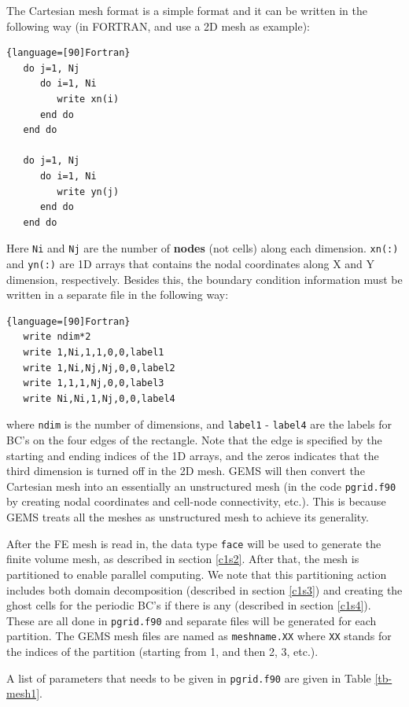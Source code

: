 \documentclass[11pt, letterpaper]{report}
\begin{document}
The Cartesian mesh format is a simple format and it can be written in the following way (in
FORTRAN, and use a 2D mesh as example):

\begin{lstlisting}{language=[90]Fortran}
   do j=1, Nj
      do i=1, Ni
         write xn(i)
      end do
   end do

   do j=1, Nj
      do i=1, Ni
         write yn(j)
      end do
   end do
\end{lstlisting}

Here \verb+Ni+ and \verb+Nj+ are the number of {\bf nodes} (not cells) along each dimension. \verb+xn(:)+ and
\verb+yn(:)+ are 1D arrays that contains the nodal coordinates along X and Y dimension,
respectively. Besides this, the boundary condition information must be written in a separate file in
the following way:

\begin{lstlisting}{language=[90]Fortran}
   write ndim*2
   write 1,Ni,1,1,0,0,label1
   write 1,Ni,Nj,Nj,0,0,label2
   write 1,1,1,Nj,0,0,label3
   write Ni,Ni,1,Nj,0,0,label4
\end{lstlisting}

where \verb+ndim+ is the number of dimensions, and \verb+label1+ - \verb+label4+ are the labels for
BC's on the four edges of the rectangle. Note that the edge is specified by the starting and ending
indices of the 1D arrays, and the zeros indicates that the third dimension is turned off in the 2D
mesh. GEMS will then convert the Cartesian mesh into an essentially an unstructured mesh (in the
code \verb+pgrid.f90+ by creating nodal coordinates and cell-node connectivity, etc.). This is because
GEMS treats all the meshes as unstructured mesh to achieve its generality.
\paraspace

After the FE mesh is read in, the data type \verb+face+ will be used to generate the finite volume
mesh, as described in section \ref{c1s2}. After that, the mesh is partitioned to enable parallel
computing. We note that this partitioning action includes both domain decomposition (described in
section \ref{c1s3}) and creating the ghost cells for the periodic BC's if there is any (described in
section \ref{c1s4}). These are all done in \verb+pgrid.f90+ and separate files will be generated for
each partition. The GEMS mesh files are named as \verb+meshname.XX+ where \verb+XX+ stands for the
indices of the partition (starting from 1, and then 2, 3, etc.).
\paraspace

A list of parameters that needs to be given in \verb+pgrid.f90+ are given in Table \ref{tb-mesh1}.
\end{document}
